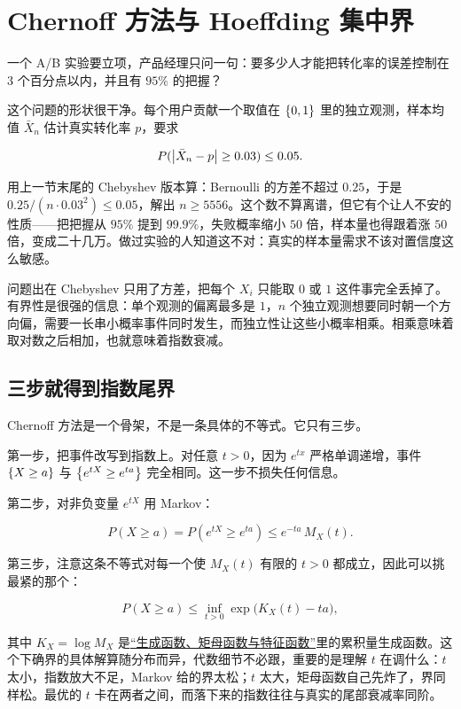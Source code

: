 \section{Chernoff 方法与 Hoeffding 集中界}
\label{sec:05-Probability/07-Transforms-and-Bounds/04}

一个 A/B 实验要立项，产品经理只问一句：要多少人才能把转化率的误差控制在 \(3\) 个百分点以内，并且有 \(95\%\) 的把握？

这个问题的形状很干净。每个用户贡献一个取值在 \(\left\{0,1\right\}\) 里的独立观测，样本均值 \(\bar X_n\) 估计真实转化率 \(p\)，要求

\[
P(\left|\bar X_n-p\right|\ge0.03)\le0.05.
\]

用上一节末尾的 Chebyshev 版本算：Bernoulli 的方差不超过 \(0.25\)，于是 \(0.25/(n\cdot0.03^2)\le0.05\)，解出 \(n\ge5556\)。这个数不算离谱，但它有个让人不安的性质——把把握从 \(95\%\) 提到 \(99.9\%\)，失败概率缩小 \(50\) 倍，样本量也得跟着涨 \(50\) 倍，变成二十几万。做过实验的人知道这不对：真实的样本量需求不该对置信度这么敏感。

问题出在 Chebyshev 只用了方差，把每个 \(X_i\) 只能取 \(0\) 或 \(1\) 这件事完全丢掉了。有界性是很强的信息：单个观测的偏离最多是 \(1\)，\(n\) 个独立观测想要同时朝一个方向偏，需要一长串小概率事件同时发生，而独立性让这些小概率相乘。相乘意味着取对数之后相加，也就意味着指数衰减。

\subsection{三步就得到指数尾界}

Chernoff 方法是一个骨架，不是一条具体的不等式。它只有三步。

第一步，把事件改写到指数上。对任意 \(t>0\)，因为 \(e^{tx}\) 严格单调递增，事件 \(\left\{X\ge a\right\}\) 与 \(\left\{e^{tX}\ge e^{ta}\right\}\) 完全相同。这一步不损失任何信息。

第二步，对非负变量 \(e^{tX}\) 用 Markov：

\[
P(X\ge a)=P(e^{tX}\ge e^{ta})\le e^{-ta}\,M_X(t).
\]

第三步，注意这条不等式对每一个使 \(M_X(t)\) 有限的 \(t>0\) 都成立，因此可以挑最紧的那个：

\[
P(X\ge a)\le\inf_{t>0}\exp\bigl(K_X(t)-ta\bigr),
\]

其中 \(K_X=\log M_X\) 是\hyperref[sec:05-Probability/07-Transforms-and-Bounds/01]{``生成函数、矩母函数与特征函数''}里的累积量生成函数。这个下确界的具体解算随分布而异，代数细节不必跟，重要的是理解 \(t\) 在调什么：\(t\) 太小，指数放大不足，Markov 给的界太松；\(t\) 太大，矩母函数自己先炸了，界同样松。最优的 \(t\) 卡在两者之间，而落下来的指数往往与真实的尾部衰减率同阶。

